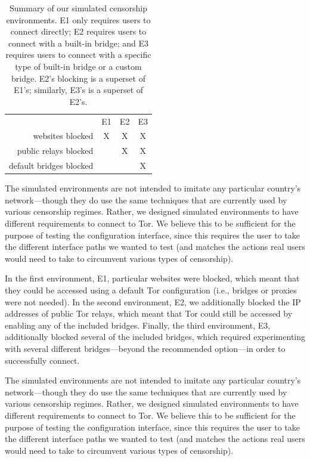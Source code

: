 \documentclass[USenglish,oneside,twocolumn]{article}
\begin{document}
\begin{table}[t]
\centering
\begin{tabular}{r c c c}
& E1 & E2 & E3 \\
websites blocked & X & X & X \\
public relays blocked & & X & X \\
default bridges blocked & & & X \\
\end{tabular}
\caption{
Summary of our simulated censorship environments.
E1 only requires users to connect directly;
E2 requires users to connect with a built-in bridge;
and E3 requires users to connect with a specific type of built-in bridge
or a custom bridge.
E2's blocking is a superset of E1's;
similarly, E3's is a superset of E2's.
}
\label{tab:environments}
\end{table}

The simulated environments are not intended to imitate any particular country's network---though they do use the same techniques that are currently used by various censorship regimes. Rather, we designed simulated environments to have different requirements to connect to Tor. We believe this to be sufficient for the purpose of testing the configuration interface, since this requires the user to take the different interface paths we wanted to test (and matches the actions real users would need to take to circumvent various types of censorship).

In the first environment, E1, particular websites were blocked, which meant that they could be accessed using a default Tor configuration (i.e., bridges or proxies were not needed). In the second environment, E2, we additionally blocked the IP addresses of public Tor relays, which meant that Tor could still be accessed by enabling any of the included bridges. Finally, the third environment, E3, additionally blocked several of the included bridges, which required experimenting with several different bridges---beyond the recommended option---in order to successfully connect.

The simulated environments are not intended to imitate any particular country's network---though they do use the same techniques that are currently used by various censorship regimes. Rather, we designed simulated environments to have different requirements to connect to Tor. We believe this to be sufficient for the purpose of testing the configuration interface, since this requires the user to take the different interface paths we wanted to test (and matches the actions real users would need to take to circumvent various types of censorship).
\end{document}
